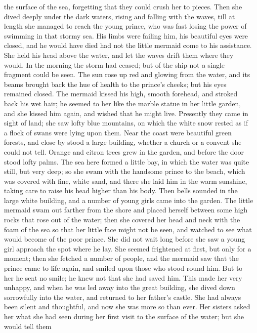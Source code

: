 the surface of the sea, forgetting that they could crush her to
pieces. Then she dived deeply under the dark waters, rising and
falling with the waves, till at length she managed to reach the
young prince, who was fast losing the power of swimming in that stormy
sea. His limbs were failing him, his beautiful eyes were closed, and
he would have died had not the little mermaid come to his
assistance. She held his head above the water, and let the waves drift
them where they would.
    In the morning the storm had ceased; but of the ship not a
single fragment could be seen. The sun rose up red and glowing from
the water, and its beams brought back the hue of health to the
prince's cheeks; but his eyes remained closed. The mermaid kissed
his high, smooth forehead, and stroked back his wet hair; he seemed to
her like the marble statue in her little garden, and she kissed him
again, and wished that he might live. Presently they came in sight
of land; she saw lofty blue mountains, on which the white snow
rested as if a flock of swans were lying upon them. Near the coast
were beautiful green forests, and close by stood a large building,
whether a church or a convent she could not tell. Orange and citron
trees grew in the garden, and before the door stood lofty palms. The
sea here formed a little bay, in which the water was quite still,
but very deep; so she swam with the handsome prince to the beach,
which was covered with fine, white sand, and there she laid him in the
warm sunshine, taking care to raise his head higher than his body.
Then bells sounded in the large white building, and a number of
young girls came into the garden. The little mermaid swam out
farther from the shore and placed herself between some high rocks that
rose out of the water; then she covered her head and neck with the
foam of the sea so that her little face might not be seen, and watched
to see what would become of the poor prince. She did not wait long
before she saw a young girl approach the spot where he lay. She seemed
frightened at first, but only for a moment; then she fetched a
number of people, and the mermaid saw that the prince came to life
again, and smiled upon those who stood round him. But to her he sent
no smile; he knew not that she had saved him. This made her very
unhappy, and when he was led away into the great building, she dived
down sorrowfully into the water, and returned to her father's
castle. She had always been silent and thoughtful, and now she was
more so than ever. Her sisters asked her what she had seen during
her first visit to the surface of the water; but she would tell them
